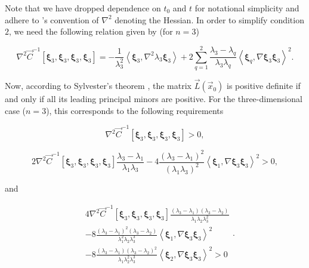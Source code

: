 \noindent Note that we have dropped dependence on $t_0$ and $t$ for notational simplicity and adhere to \cite{Haller14}'s convention of $\nabla^2$ denoting the Hessian. In order to simplify condition $2$, we need the following relation given by \cite{Haller14} (for $n=3$)

\begin{equation}\label{eq:Haller_relation}
\nabla^2\vec{C}^{-1}\left[\bm{\xi}_3,\bm{\xi}_3,\bm{\xi}_3,\bm{\xi}_3\right] = -\frac{1}{\lambda_3^2}\left\langle\bm{\xi}_3,\nabla^2\lambda_3\bm{\xi}_3\right\rangle + 2\sum_{q=1}^{2}\frac{\lambda_3-\lambda_q}{\lambda_3\lambda_q}
\left\langle\bm{\xi}_q,\nabla\bm{\xi}_3\bm{\xi}_3\right\rangle^2.
\end{equation}

Now, according to Sylvester's theorem \citep{Sylvester}, the matrix $\vec{L}(\vec{x}_0)$ is positive definite if and only if all its leading principal minors are positive. For the three-dimensional case ($n=3$), this corresponds to the following requirements

\begin{equation}\label{eq:principal_1}
\nabla^2\vec{C}^{-1}\left[\bm{\xi}_3,\bm{\xi}_3,\bm{\xi}_3,\bm{\xi}_3\right] > 0,
\end{equation}

\begin{equation}\label{eq:principal_2}
2\nabla^2\vec{C}^{-1}\left[\bm{\xi}_3,\bm{\xi}_3,\bm{\xi}_3,\bm{\xi}_3\right]\frac{\lambda_3-\lambda_1}{\lambda_1\lambda_3} - 4\frac{(\lambda_3-\lambda_1)^2}{(\lambda_1\lambda_3)^2}\left\langle\bm{\xi}_1,\nabla\bm{\xi}_3\bm{\xi}_3\right\rangle^2 > 0,
\end{equation}

\noindent and

\begin{equation}\label{eq:principal_3}
\begin{split}
& 4\nabla^2\vec{C}^{-1}\left[\bm{\xi}_3,\bm{\xi}_3,\bm{\xi}_3,\bm{\xi}_3\right]\frac{(\lambda_3-\lambda_1)(\lambda_3-\lambda_2)}{\lambda_1\lambda_2\lambda_3^2} \\
& -8\frac{(\lambda_3-\lambda_1)^2(\lambda_3-\lambda_2)}{\lambda_1^2\lambda_2\lambda_3^3}\left\langle\bm{\xi}_1,\nabla\bm{\xi}_3\bm{\xi}_3\right\rangle^2\\
& -8\frac{(\lambda_3-\lambda_1)(\lambda_3-\lambda_2)^2}{\lambda_1\lambda_2^2\lambda_3^3}\left\langle\bm{\xi}_2,\nabla\bm{\xi}_3\bm{\xi}_3\right\rangle^2 > 0
\end{split}.
\end{equation}

